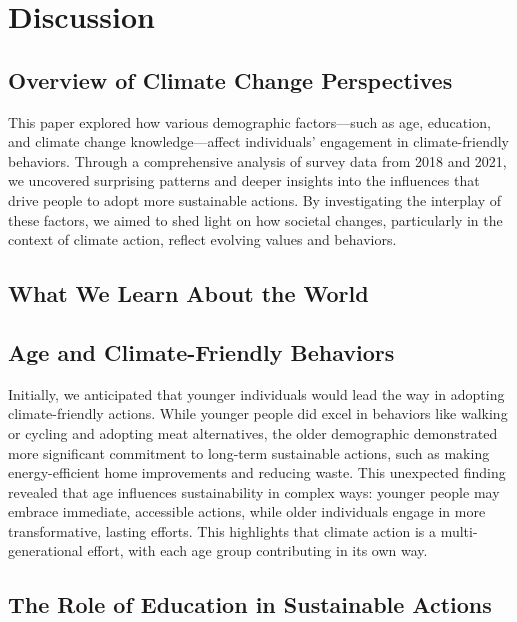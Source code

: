 \documentclass[
  letterpaper,
  DIV=11,
  numbers=noendperiod]{scrartcl}
\begin{document}
\section{Discussion}\label{sec-discussion}

\subsection{Overview of Climate Change
Perspectives}\label{overview-of-climate-change-perspectives}

This paper explored how various demographic factors---such as age,
education, and climate change knowledge---affect individuals' engagement
in climate-friendly behaviors. Through a comprehensive analysis of
survey data from 2018 and 2021, we uncovered surprising patterns and
deeper insights into the influences that drive people to adopt more
sustainable actions. By investigating the interplay of these factors, we
aimed to shed light on how societal changes, particularly in the context
of climate action, reflect evolving values and behaviors.

\subsection{What We Learn About the
World}\label{what-we-learn-about-the-world}

\subsection{Age and Climate-Friendly Behaviors}\label{sec-first-point}

Initially, we anticipated that younger individuals would lead the way in
adopting climate-friendly actions. While younger people did excel in
behaviors like walking or cycling and adopting meat alternatives, the
older demographic demonstrated more significant commitment to long-term
sustainable actions, such as making energy-efficient home improvements
and reducing waste. This unexpected finding revealed that age influences
sustainability in complex ways: younger people may embrace immediate,
accessible actions, while older individuals engage in more
transformative, lasting efforts. This highlights that climate action is
a multi-generational effort, with each age group contributing in its own
way.

\subsection{The Role of Education in Sustainable
Actions}\label{sec-second-point}
\end{document}

